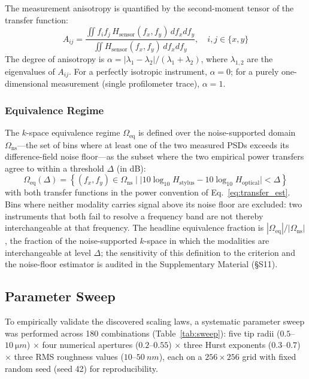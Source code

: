 \documentclass[review,12pt]{elsarticle}
\begin{document}
The measurement anisotropy is quantified by the second-moment tensor of the transfer function:
\begin{equation}
    A_{ij} = \frac{\iint f_i f_j \, H_\mathrm{sensor}(f_x,f_y) \, df_x df_y}{\iint H_\mathrm{sensor}(f_x,f_y) \, df_x df_y}, \quad i,j \in \{x,y\}
    \label{eq:anisotropy}
\end{equation}
The degree of anisotropy is $\alpha = |\lambda_1 - \lambda_2|/(\lambda_1 + \lambda_2)$, where $\lambda_{1,2}$ are the eigenvalues of $ A_{ij}$. For a perfectly isotropic instrument, $\alpha=0$; for a purely one-dimensional measurement (single profilometer trace), $\alpha=1$.

\subsubsection{Equivalence Regime}

The $ k$-space equivalence regime $\Omega_\mathrm{eq}$ is defined over the noise-supported domain $\Omega_\mathrm{ns}$---the set of bins where at least one of the two measured PSDs exceeds its difference-field noise floor---as the subset where the two empirical power transfers agree to within a threshold $\Delta$ (in dB):
\begin{equation}
    \Omega_\mathrm{eq}(\Delta) = \left\{(f_x,f_y) \in \Omega_\mathrm{ns} \;\Big|\; \big|10\log_{10} H_\mathrm{stylus} - 10\log_{10} H_\mathrm{optical}\big| < \Delta\right\}
    \label{eq:equivalence}
\end{equation}
with both transfer functions in the power convention of Eq.~\ref{eq:transfer_est}. Bins where neither modality carries signal above its noise floor are excluded: two instruments that both fail to resolve a frequency band are not thereby interchangeable at that frequency. The headline equivalence fraction is $|\Omega_\mathrm{eq}| / |\Omega_\mathrm{ns}|$, the fraction of the noise-supported $k$-space in which the modalities are interchangeable at level $\Delta$; the sensitivity of this definition to the criterion and the noise-floor estimator is audited in the Supplementary Material (\S S11).

\subsection{Parameter Sweep}
\label{sec:sweep}

To empirically validate the discovered scaling laws, a systematic parameter sweep was performed across 180 combinations (Table~\ref{tab:sweep}): five tip radii ($0.5$--$\SI{10}{\micro m}$) $\times$ four numerical apertures ($0.2$--$0.55$) $\times$ three Hurst exponents ($0.3$--$0.7$) $\times$ three RMS roughness values ($10$--$\SI{50}{nm}$), each on a $256 \times 256$ grid with fixed random seed (seed 42) for reproducibility.
\end{document}
